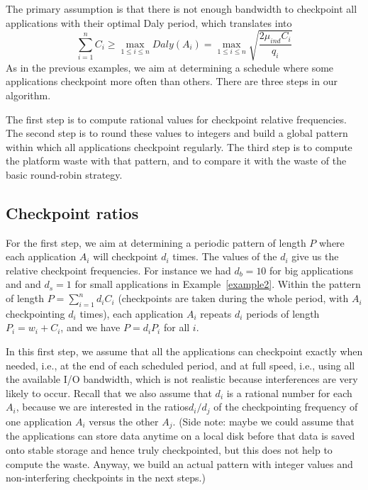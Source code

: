 \documentclass{article}
\newcommand{\ema}[1]{\ensuremath{#1}}
\newcommand{\Daly}{\ema{\mathit{Daly}}\xspace}
\begin{document}
The primary assumption is that there is not enough bandwidth to checkpoint
all applications with their optimal Daly period, which translates into
$$\sum_{i=1}^{n} C_{i} \geq \max_{1 \leq i \leq n} \Daly(A_{i})  = \max_{1 \leq i \leq n} \sqrt{\frac{2 \mu_{ind} C_{i}}{q_{i}}}$$
As in the previous examples, we aim at determining a schedule where some applications checkpoint more often than others. There are three steps in our algorithm. 

The first step is to compute rational values for checkpoint relative frequencies. 
The second step is to round these values to integers and build a global pattern
within which all applications checkpoint regularly. The third step is to compute the platform
waste with that pattern, and to compare it with the waste of the  basic round-robin strategy.

\subsection{Checkpoint ratios}

For the first step, we  aim at determining
a periodic pattern of length $P$ where each application $A_{i}$ will checkpoint $d_{i}$ times.
The values of the $d_{i}$ give us the relative checkpoint frequencies. For instance we had
$d_{b} = 10$ for big applications and and $d_{s} = 1$ for small applications in Example~\ref{example2}.
Within the pattern of length $P  = \sum_{i=1}^{n} d_{i} C_{i}$ (checkpoints are taken during the 
whole period, with $A_{i}$ checkpointing $d_{i}$ times), 
each application $A_{i}$ repeats $d_{i}$ periods of length $P_{i} = w_{i}+C_{i}$,
and we have $P = d_{i} P_{i}$ for all $i$.

In this first step, we assume that all the applications can checkpoint exactly when needed, i.e.,
at the end of each scheduled period, and at full speed, i.e., using all the available I/O bandwidth,
which is not realistic because interferences are very likely to occur. 
Recall that we also assume that $d_{i}$ is a rational number for each $A_{i}$, because we are interested in the ratios$d_{i}/d_{j}$ of the checkpointing frequency of one application $A_{i}$ versus the other $A_{j}$. (Side note: maybe
we could assume that the applications can store data anytime on a local disk
before that data is saved onto stable storage and hence truly checkpointed, but this does not help
to compute the waste. Anyway, we build an actual pattern with integer values and non-interfering checkpoints in  the next steps.)
\end{document}
